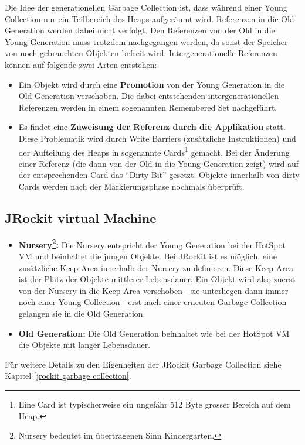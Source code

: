 Die Idee der generationellen Garbage Collection ist, dass während einer Young Collection nur ein Teilbereich des Heaps aufgeräumt wird. Referenzen in die Old Generation werden dabei nicht verfolgt. Den Referenzen von der Old in die Young Generation muss trotzdem nachgegangen werden, da sonst der Speicher von noch gebrauchten Objekten befreit wird. Intergenerationelle Referenzen können auf folgende zwei Arten entstehen:
\begin{itemize}
	\item Ein Objekt wird durch eine  \textbf{Promotion} von der Young Generation in die Old Generation verschoben. Die dabei entstehenden intergenerationellen Referenzen werden in einem sogenannten Remembered Set nachgeführt. 
	\item Es findet eine \textbf{Zuweisung der Referenz durch die Applikation} statt. Diese Problematik wird durch Write Barriers (zusätzliche Instruktionen) und der Aufteilung des Heaps in sogenannte Cards\footnote{Eine Card ist typischerweise ein ungefähr 512 Byte grosser Bereich auf dem Heap.} gemacht. Bei der Änderung einer Referenz (die dann von der Old in die Young Generation zeigt) wird auf der entsprechenden Card das ``Dirty Bit'' gesetzt. Objekte innerhalb von dirty Cards werden nach der Markierungsphase nochmals überprüft.
\end{itemize}

\subsection{JRockit virtual Machine}
\begin{itemize}
	\item \textbf{Nursery\footnote{Nursery bedeutet im übertragenen Sinn Kindergarten.}:} Die Nursery entspricht der Young Generation bei der HotSpot VM und beinhaltet die jungen Objekte. Bei JRockit ist es möglich, eine zusätzliche Keep-Area innerhalb der Nursery zu definieren. Diese Keep-Area ist der Platz der Objekte mittlerer Lebensdauer. Ein Objekt wird also zuerst von der Nursery in die Keep-Area verschoben - sie unterliegen dann immer noch einer Young Collection - erst nach einer erneuten Garbage Collection gelangen sie in die Old Generation.
	\item \textbf{Old Generation: } Die Old Generation beinhaltet wie bei der HotSpot VM die Objekte mit langer Lebensdauer.
\end{itemize}
Für weitere Details zu den Eigenheiten der JRockit Garbage Collection siehe Kapitel \ref{jrockit garbage collection}.


